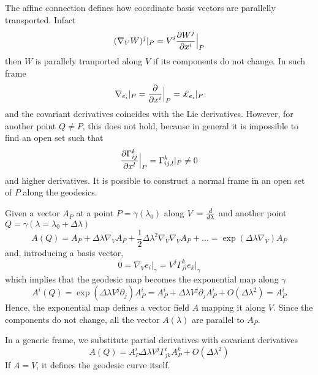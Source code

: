     The affine connection defines how coordinate basis vectors are parallelly transported. Infact
    \begin{equation*}
        (\nabla_V W)^j \vert_P = V^i \frac{\partial W^j}{\partial x^i} \Big \vert_P
    \end{equation*}
    then $W$ is parallely tranported along $V$ if its components do not change. In such frame 
    \begin{equation*}
        \nabla_{e_i} \vert_P = \pdv{}{x^i} \Big \vert_P = \pounds_{e_i} \vert_P
    \end{equation*}
    and the covariant derivatives coincides with the Lie derivatives. However, for another point $Q \neq P$, this does not hold, because in general it is impossible to find an open set such that 
    \begin{equation*}
        \frac{\partial\Gamma^k_{ij}}{\partial x^l} \Big \vert_P = \Gamma^k_{ij,l} \vert_P \neq 0 
    \end{equation*}
    and higher derivatives. It is possible to construct a normal frame in an open set of $P$ along the geodesics.

    Given a vector $A_P$ at a point $P = \gamma(\lambda_0)$ along $V = \frac{d}{d\lambda}$ and another point $Q = \gamma(\lambda = \lambda_0 + \Delta \lambda)$ 
    \begin{equation*}
        A(Q) = A_P + \Delta \lambda \nabla_V A_P + \frac{1}{2} \Delta \lambda^2 \nabla_V \nabla_V A_P + \ldots = \exp(\Delta \lambda \nabla_V) A_P
    \end{equation*}
    and, introducing a basis vector, 
    \begin{equation*}
        0 = \nabla_V e_i \vert_\gamma = V^j \Gamma^k_{ji} e_k \vert_\gamma 
    \end{equation*}
    which implies that the geodesic map becomes the exponential map along $\gamma$ 
    \begin{equation*}
        A^i(Q) = \exp(\Delta \lambda V^j \partial_j) A^i_P = A^i_P + \Delta \lambda V^j \partial_j A^i_P + O(\Delta \lambda^2) = A^i_P
    \end{equation*}
    Hence, the exponential map defines a vector field $A$ mapping it along $V$. Since the components do not change, all the vector $A(\lambda)$ are parallel to $A_P$.

    In a generic frame, we substitute partial derivatives with covariant derivatives
    \begin{equation*}
        A(Q) = A^i_P \Delta \lambda V^j \Gamma^i_{jk} A^k_P + O(\Delta \lambda^2) 
    \end{equation*}
    If $A = V$, it defines the geodesic curve itself.

